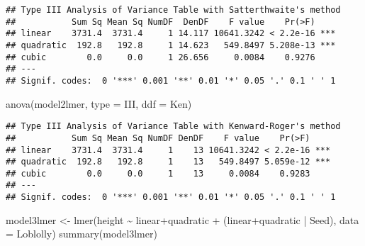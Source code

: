 \documentclass[
]{book}
\newenvironment{Shaded}{\begin{snugshade}}{\end{snugshade}}
\newcommand{\AttributeTok}[1]{\textcolor[rgb]{0.77,0.63,0.00}{#1}}
\newcommand{\FunctionTok}[1]{\textcolor[rgb]{0.00,0.00,0.00}{#1}}
\newcommand{\NormalTok}[1]{#1}
\newcommand{\OtherTok}[1]{\textcolor[rgb]{0.56,0.35,0.01}{#1}}
\newcommand{\SpecialCharTok}[1]{\textcolor[rgb]{0.00,0.00,0.00}{#1}}
\newcommand{\StringTok}[1]{\textcolor[rgb]{0.31,0.60,0.02}{#1}}
\begin{document}
\begin{verbatim}
## Type III Analysis of Variance Table with Satterthwaite's method
##           Sum Sq Mean Sq NumDF  DenDF    F value    Pr(>F)    
## linear    3731.4  3731.4     1 14.117 10641.3242 < 2.2e-16 ***
## quadratic  192.8   192.8     1 14.623   549.8497 5.208e-13 ***
## cubic        0.0     0.0     1 26.656     0.0084    0.9276    
## ---
## Signif. codes:  0 '***' 0.001 '**' 0.01 '*' 0.05 '.' 0.1 ' ' 1
\end{verbatim}

\begin{Shaded}
\begin{Highlighting}[]
\FunctionTok{anova}\NormalTok{(model2lmer, }\AttributeTok{type =} \StringTok{\textquotesingle{}III\textquotesingle{}}\NormalTok{, }\AttributeTok{ddf =} \StringTok{\textquotesingle{}Ken\textquotesingle{}}\NormalTok{)}
\end{Highlighting}
\end{Shaded}

\begin{verbatim}
## Type III Analysis of Variance Table with Kenward-Roger's method
##           Sum Sq Mean Sq NumDF DenDF    F value    Pr(>F)    
## linear    3731.4  3731.4     1    13 10641.3242 < 2.2e-16 ***
## quadratic  192.8   192.8     1    13   549.8497 5.059e-12 ***
## cubic        0.0     0.0     1    13     0.0084    0.9283    
## ---
## Signif. codes:  0 '***' 0.001 '**' 0.01 '*' 0.05 '.' 0.1 ' ' 1
\end{verbatim}

\begin{Shaded}
\begin{Highlighting}[]
\NormalTok{model3lmer }\OtherTok{\textless{}{-}} \FunctionTok{lmer}\NormalTok{(height }\SpecialCharTok{\textasciitilde{}}\NormalTok{ linear}\SpecialCharTok{+}\NormalTok{quadratic }\SpecialCharTok{+}\NormalTok{ (linear}\SpecialCharTok{+}\NormalTok{quadratic }\SpecialCharTok{|}\NormalTok{ Seed), }\AttributeTok{data =}\NormalTok{ Loblolly)}
\FunctionTok{summary}\NormalTok{(model3lmer)}
\end{Highlighting}
\end{Shaded}
\end{document}
